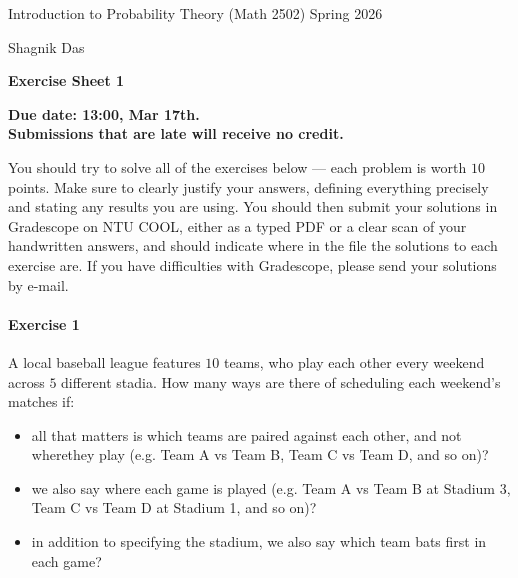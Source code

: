 \documentclass[a4paper,12pt]{article}
\newcommand{\courseTitle}{Introduction to Probability Theory (Math 2502)}
\newcommand{\semester}{Spring 2026}
\newcommand{\instructorA}{Shagnik Das}
\newcommand{\instructorB}{}
\newcommand{\sheetNumber}{1}
\newcommand{\dueDate}{13:00, Mar 17th.}
\newcommand{\lateWarning}{Submissions that are late will receive no credit.}
\newcommand{\buildtitle}[4]{
\begin{flushleft}
{\large
#1
\hfill{}
#2
\par
#3
}
\end{flushleft}
\vskip 4pt
\begin{center}
{\large\bfseries#4\par}
\end{center}
\bigskip
}
\begin{document}
\buildtitle{\courseTitle{}}{\semester}{\instructorA{} \hfill \instructorB{}}{Exercise Sheet \sheetNumber{}}

\vspace{-0.2in}

\begin{center}

{\bf Due date: \dueDate \\ \lateWarning}

\end{center}

\noindent You should try to solve all of the exercises below --- each problem is worth $10$ points. Make sure to clearly justify your answers, defining everything precisely and stating any results you are using. You should then submit your solutions in Gradescope on NTU COOL, either as a typed PDF or a clear scan of your handwritten answers, and should indicate where in the file the solutions to each exercise are. If you have difficulties with Gradescope, please send your solutions by e-mail.

\paragraph{Exercise 1}  A local baseball league features $10$ teams, who play each other every weekend across $5$ different stadia. How many ways are there of scheduling each weekend's matches if:
\begin{itemize}
	\item[(a)] all that matters is which teams are paired against each other, and not wherethey play (e.g. Team A vs Team B, Team C vs Team D, and so on)?
	\item[(b)] we also say where each game is played (e.g. Team A vs Team B at Stadium 3, Team C vs Team D at Stadium 1, and so on)?
	\item[(c)] in addition to specifying the stadium, we also say which team bats first in each game?
\end{itemize}
\end{document}
